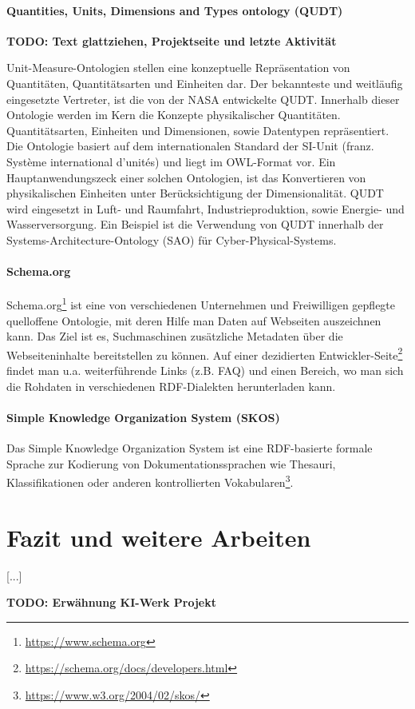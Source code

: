 \documentclass{article}
\begin{document}
\paragraph{Quantities, Units, Dimensions and Types ontology (QUDT)}

\textbf{TODO: Text glattziehen, Projektseite und letzte Aktivität}

Unit-Measure-Ontologien stellen eine konzeptuelle Repräsentation von Quantitäten, Quantitätsarten und Einheiten dar.
Der bekannteste und weitläufig eingesetzte Vertreter, ist die von der NASA entwickelte QUDT\cite{QUDTOntology}.
Innerhalb dieser Ontologie werden im Kern die Konzepte physikalischer Quantitäten.
Quantitätsarten, Einheiten und Dimensionen, sowie Datentypen repräsentiert.
Die Ontologie basiert auf dem internationalen Standard der SI-Unit (franz. Système international d'unités) und liegt im OWL-Format vor. Ein Hauptanwendungszeck einer solchen Ontologien, ist das Konvertieren von physikalischen  Einheiten unter Berücksichtigung der Dimensionalität.
QUDT wird eingesetzt in Luft- und Raumfahrt, Industrieproduktion, sowie Energie- und Wasserversorgung.
Ein Beispiel ist die Verwendung von QUDT innerhalb der Systems-Architecture-Ontology (SAO) für Cyber-Physical-Systems.

\paragraph{Schema.org}

Schema.org\footnote{\url{https://www.schema.org}} ist eine von verschiedenen Unternehmen und Freiwilligen gepflegte quelloffene Ontologie, mit deren Hilfe man Daten auf Webseiten auszeichnen kann.
Das Ziel ist es, Suchmaschinen zusätzliche Metadaten über die Webseiteninhalte bereitstellen zu können.
Auf einer dezidierten Entwickler-Seite\footnote{\url{https://schema.org/docs/developers.html}} findet man u.a. weiterführende Links (z.B. FAQ) und einen Bereich, wo man sich die Rohdaten in verschiedenen RDF-Dialekten herunterladen kann.

\paragraph{Simple Knowledge Organization System (SKOS)}

Das Simple Knowledge Organization System ist eine RDF-basierte formale Sprache zur Kodierung von Dokumentationssprachen wie Thesauri, Klassifikationen oder anderen kontrollierten Vokabularen\footnote{\url{https://www.w3.org/2004/02/skos/}}.



\section{Fazit und weitere Arbeiten}

[...]

\textbf{TODO: Erwähnung KI-Werk Projekt}



\medskip

\printbibliography
\end{document}
